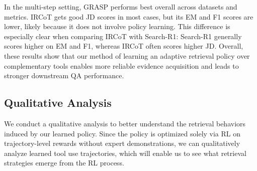 \documentclass[11pt]{article}
\newcommand{\ml}[1]{\textcolor{orange}{\bf [lan: #1]}}
\begin{document}
In the multi-step setting, GRASP performs best overall across datasets and metrics. IRCoT gets good JD scores in most cases, but its EM and F1 scores are lower, likely because it does not involve policy learning. This difference is especially clear when comparing IRCoT with Search-R1: Search-R1 generally scores higher on EM and F1, whereas IRCoT often scores higher JD. Overall, these results show that our method of learning an adaptive retrieval policy over complementary tools enables more reliable evidence acquisition and leads to stronger downstream QA performance.




\subsection{Qualitative Analysis}
\label{sec:qual}
We conduct a qualitative analysis to better understand the retrieval behaviors induced by our learned policy. Since the policy is optimized solely via RL on trajectory-level rewards without expert demonstrations, we can qualitatively analyze learned tool use trajectories, which will enable us to see what retrieval strategies emerge from the RL process.


\end{document}

